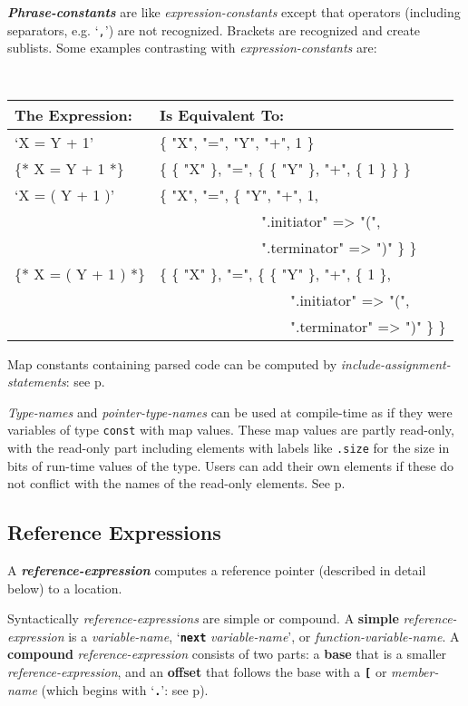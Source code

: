 \documentclass[12pt]{article}
\newcommand{\TT}[1]{{\tt \bfseries #1}}
\newcommand{\key}[1]{{\rm \bfseries #1}}
\newcommand{\emkey}[1]{{\em \bfseries #1}}
\newcommand{\pagref}[1]{p\pageref{#1}}
\begin{document}
\emkey{Phrase-constants}\label{PHRASE-CONSTANT}
are like {\em expression-constants} except that
operators (including separators, e.g. `{\tt ,}') are not recognized.
Brackets are recognized and create sublists.  Some examples contrasting
with {\em expression-constants} are:
\begin{center} \tt
\begin{tabular}{l@{~~~}l}
\rm The Expression:	& \rm Is Equivalent To:
\\\hline
`X = Y + 1'			& \{ "X", "=", "Y", "+", 1 \}
\\[0.5ex]
\{* X = Y + 1 *\}		& \{ \{ "X" \}, "=",
                                     \{ \{ "Y" \}, "+", \{ 1 \} \} \}
\\[0.5ex]
`X = ( Y + 1 )'		& \{ "X", "=", \{ "Y", "+", 1, \\
                        & ~~~~~~~~~~~~~~".initiator" => "(", \\
                        & ~~~~~~~~~~~~~~".terminator" => ")" \} \}
\\[0.5ex]
\{* X = ( Y + 1 ) *\}	& \{ \{ "X" \}, "=", \{ \{ "Y" \}, "+", \{ 1 \}, \\
                        & ~~~~~~~~~~~~~~~~~~".initiator" => "(", \\
                        & ~~~~~~~~~~~~~~~~~~".terminator" => ")" \} \}
\end{tabular}
\end{center}

Map constants containing parsed code can be computed
by {\em include-assignment-statements}:
see \pagref{INCLUDE-ASSIGNMENT-STATEMENT}.

{\em Type-names} and {\em pointer-type-names} can be used at
compile-time as if they were variables of type {\tt const}
with map values.  These map values are partly read-only,
with the read-only part including elements with labels like
{\tt .size} for the size in bits of run-time values of the type.
Users can add their own elements if these do not conflict
with the names of the read-only elements.  See \pagref{TYPE-MAPS}.

\subsection{Reference Expressions}
\label{REFERENCE-EXPRESSIONS}

A \emkey{reference-expression} computes a
reference pointer (described in detail below) to a location.

Syntactically {\em reference-expressions} are simple or compound.
A \key{simple} {\em reference-expression} is
a {\em variable-name}, `\TT{next} {\em variable-name}', or
{\em function-variable-name}.
A \key{compound} {\em refer\-ence-expression} consists of two parts:
a \key{base} that is a smaller {\em reference-expression},
and an \key{offset} that follows the base with
a \TT{[} or {\em member-name}
(which begins with `\TT{.}': see \pagref{MEMBER-NAME}).
\end{document}
